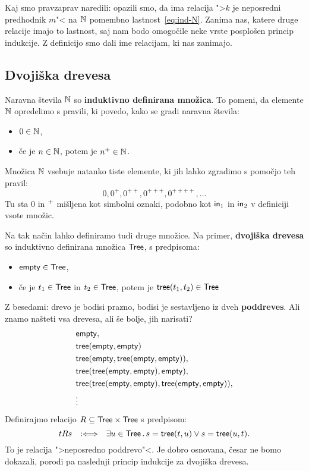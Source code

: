 Kaj smo pravzaprav naredili: opazili smo, da ima relacija ">$k$ je neposredni predhodnik $m$"< na $\mathbb{N}$ pomembno
lastnost~\eqref{eq:ind-N}. Zanima nas, katere druge relacije imajo to lastnost, saj nam bodo omogočile neke vrste
posplošen princip indukcije. Z definicijo smo dali ime relacijam, ki nas zanimajo.


\subsection{Dvojiška drevesa}

Naravna števila $\mathbb{N}$ so \textbf{induktivno definirana množica}. To pomeni, da elemente $\mathbb{N}$
opredelimo s pravili, ki povedo, kako se gradi naravna števila:
%
\begin{itemize}
\item $0 \in \mathbb{N}$,
\item če je $n \in \mathbb{N}$, potem je ${n^{+}} \in \mathbb{N}$.
\end{itemize}
%
Množica $\mathbb{N}$ vsebuje natanko tiste elemente, ki jih lahko zgradimo s pomočjo teh pravil:
%
\begin{equation*}
    0, 0^{+}, 0^{++}, 0^{+++}, 0^{++++}, \ldots
\end{equation*}
%
Tu sta $0$ in ${{}^{+}}$ mišljena kot simbolni oznaki, podobno kot $\mathsf{in}_{1}$ in $\mathsf{in}_{2}$ v definiciji
vsote množic.

Na tak način lahko definiramo tudi druge množice. Na primer, \textbf{dvojiška drevesa} so
induktivno definirana množica $\mathsf{Tree}$, s predpisoma:
%
\begin{itemize}
\item $\mathsf{empty} \in \mathsf{Tree}$,
\item če je $t_1 \in \mathsf{Tree}$ in $t_2 \in \mathsf{Tree}$, potem je $\mathsf{tree}(t_1, t_2) \in \mathsf{Tree}$
\end{itemize}
%
Z besedami: drevo je bodisi prazno, bodisi je sestavljeno iz dveh \textbf{poddreves}. Ali znamo
našteti vsa drevesa, ali še bolje, jih narisati?
%
\begin{align*}
    & \mathsf{empty}, \\
    & \mathsf{tree}(\mathsf{empty}, \mathsf{empty}) \\
    & \mathsf{tree}(\mathsf{empty}, \mathsf{tree}(\mathsf{empty}, \mathsf{empty})), \\
    & \mathsf{tree}(\mathsf{tree}(\mathsf{empty}, \mathsf{empty}), \mathsf{empty}), \\
    & \mathsf{tree}(\mathsf{tree}(\mathsf{empty}, \mathsf{empty}), \mathsf{tree}(\mathsf{empty}, \mathsf{empty})), \\
    & \vdots
\end{align*}
%
Definirajmo relacijo $R \subseteq \mathsf{Tree} \times \mathsf{Tree}$ s predpisom:
%
\begin{equation*}
  t R s \quad {{:}{\Longleftrightarrow}}\quad \exists u \in \mathsf{Tree} \,.\, s = \mathsf{tree}(t, u) \lor s = \mathsf{tree}(u, t).
\end{equation*}
%
To je relacija ">neposredno poddrevo"<. Je dobro osnovana, česar ne bomo dokazali, porodi pa naslednji princip indukcije za dvojiška drevesa.

